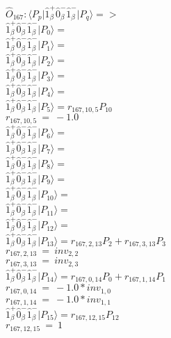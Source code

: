 \documentclass[14pt]{article}
\begin{document}
    $\hat{O}_{167}:  \langle{P_p}\vert \hat{1}_{\beta}^{+}\hat{0}_{\beta}^{-}\hat{1}_{\beta}^{-} \vert{P_q}\rangle => $ \\ 
    $ \hat{1}_{\beta}^{+}\hat{0}_{\beta}^{-}\hat{1}_{\beta}^{-} \vert{P_{0}}\rangle =  $ \\ 
    $ \hat{1}_{\beta}^{+}\hat{0}_{\beta}^{-}\hat{1}_{\beta}^{-} \vert{P_{1}}\rangle =  $ \\ 
    $ \hat{1}_{\beta}^{+}\hat{0}_{\beta}^{-}\hat{1}_{\beta}^{-} \vert{P_{2}}\rangle =  $ \\ 
    $ \hat{1}_{\beta}^{+}\hat{0}_{\beta}^{-}\hat{1}_{\beta}^{-} \vert{P_{3}}\rangle =  $ \\ 
    $ \hat{1}_{\beta}^{+}\hat{0}_{\beta}^{-}\hat{1}_{\beta}^{-} \vert{P_{4}}\rangle =  $ \\ 
    $ \hat{1}_{\beta}^{+}\hat{0}_{\beta}^{-}\hat{1}_{\beta}^{-} \vert{P_{5}}\rangle = {r}_{167,10,5}P_{10} $ \\ 
    ${r}_{167,10,5}\ =\ -1.0 $ \\ 
    $ \hat{1}_{\beta}^{+}\hat{0}_{\beta}^{-}\hat{1}_{\beta}^{-} \vert{P_{6}}\rangle =  $ \\ 
    $ \hat{1}_{\beta}^{+}\hat{0}_{\beta}^{-}\hat{1}_{\beta}^{-} \vert{P_{7}}\rangle =  $ \\ 
    $ \hat{1}_{\beta}^{+}\hat{0}_{\beta}^{-}\hat{1}_{\beta}^{-} \vert{P_{8}}\rangle =  $ \\ 
    $ \hat{1}_{\beta}^{+}\hat{0}_{\beta}^{-}\hat{1}_{\beta}^{-} \vert{P_{9}}\rangle =  $ \\ 
    $ \hat{1}_{\beta}^{+}\hat{0}_{\beta}^{-}\hat{1}_{\beta}^{-} \vert{P_{10}}\rangle =  $ \\ 
    $ \hat{1}_{\beta}^{+}\hat{0}_{\beta}^{-}\hat{1}_{\beta}^{-} \vert{P_{11}}\rangle =  $ \\ 
    $ \hat{1}_{\beta}^{+}\hat{0}_{\beta}^{-}\hat{1}_{\beta}^{-} \vert{P_{12}}\rangle =  $ \\ 
    $ \hat{1}_{\beta}^{+}\hat{0}_{\beta}^{-}\hat{1}_{\beta}^{-} \vert{P_{13}}\rangle = {r}_{167,2,13}P_{2}+{r}_{167,3,13}P_{3} $ \\ 
    ${r}_{167,2,13}\ =\ {inv}_{2,2} $ \\ 
    ${r}_{167,3,13}\ =\ {inv}_{2,3} $ \\ 
    $ \hat{1}_{\beta}^{+}\hat{0}_{\beta}^{-}\hat{1}_{\beta}^{-} \vert{P_{14}}\rangle = {r}_{167,0,14}P_{0}+{r}_{167,1,14}P_{1} $ \\ 
    ${r}_{167,0,14}\ =\ -1.0*{inv}_{1,0} $ \\ 
    ${r}_{167,1,14}\ =\ -1.0*{inv}_{1,1} $ \\ 
    $ \hat{1}_{\beta}^{+}\hat{0}_{\beta}^{-}\hat{1}_{\beta}^{-} \vert{P_{15}}\rangle = {r}_{167,12,15}P_{12} $ \\ 
    ${r}_{167,12,15}\ =\ 1 $ \\ 
    
\end{document}

